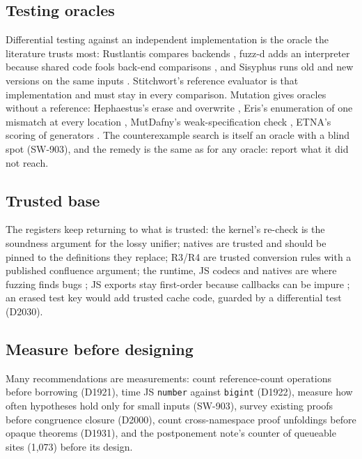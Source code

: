 \documentclass[11pt,a4paper]{article}
\newcommand{\code}[1]{\texttt{#1}}
\begin{document}
\subsection{Testing oracles}
Differential testing against an independent implementation is the oracle the literature trusts
most: Rustlantis compares backends \cite{wang2024rustlantis}, fuzz-d adds an interpreter
because shared code fools back-end comparisons \cite{donaldson2024fuzzd}, and Sisyphus runs old
and new versions on the same inputs \cite{gopinathan2023sisyphus}. Stitchwort's reference
evaluator is that implementation and must stay in every comparison. Mutation gives oracles
without a reference: Hephaestus's erase and overwrite \cite{chaliasos2022hephaestus}, Eris's
enumeration of one mismatch at every location \cite{sotiropoulos2026eris}, MutDafny's
weak-specification check \cite{amaral2026mutdafny}, ETNA's scoring of generators
\cite{shi2023etna}. The counterexample search is itself an oracle with a blind spot (SW-903), and
the remedy is the same as for any oracle: report what it did not reach.

\subsection{Trusted base}
The registers keep returning to what is trusted: the kernel's re-check is the soundness
argument for the lossy unifier; natives are trusted and should be pinned to the definitions
they replace; R3/R4 are trusted conversion rules with a published confluence argument; the
runtime, JS codecs and natives are where fuzzing finds bugs \cite{kirancodes2026leanzip}; JS
exports stay first-order because callbacks can be impure \cite{forster2024extraction}; an erased
test key would add trusted cache code, guarded by a differential test (D2030).

\subsection{Measure before designing}
Many recommendations are measurements: count reference-count operations before borrowing
(D1921), time JS \code{number} against \code{bigint} (D1922), measure how often hypotheses hold
only for small inputs (SW-903), survey existing proofs before congruence closure (D2000), count
cross-namespace proof unfoldings before opaque theorems (D1931), and the postponement note's
counter of queueable sites (1,073) before its design.

\end{document}
